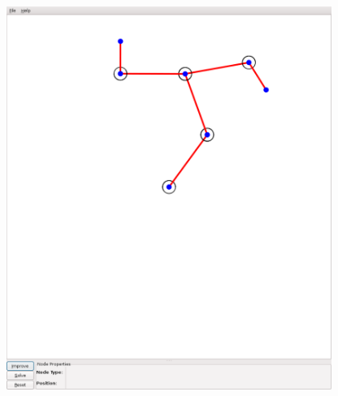 \documentclass{article}
\begin{document}
\begin{center}
        \includegraphics[width=400px]{pose_final.png}
    \end{center}
\end{document}
